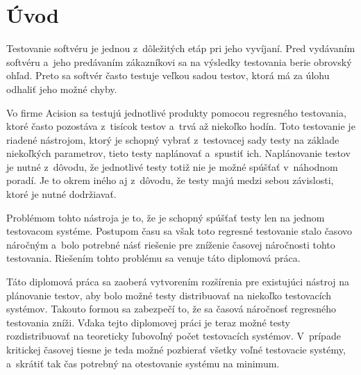 


%
%
\chapter{Úvod}
\label{kapitola:uvod}
Testovanie softvéru je jednou z~dôležitých etáp pri jeho vyvíjaní.
Pred vydávaním softvéru a~jeho predávaním zákazníkovi sa na výsledky
testovania berie obrovský ohľad. Preto sa softvér často testuje veľkou
sadou testov, ktorá má za úlohu odhaliť jeho možné chyby.

Vo firme Acision sa testujú jednotlivé produkty pomocou regresného 
testovania, ktoré často pozostáva z~tisícok testov a~trvá až niekoľko hodín.
Toto testovanie je riadené nástrojom, ktorý je schopný vybrať 
z~testovacej sady testy na základe niekoľkých parametrov, tieto testy 
naplánovať a~spustiť ich. 
Naplánovanie testov je nutné z~dôvodu, že jednotlivé testy totiž nie je 
možné spúšťať v~náhodnom poradí. Je to okrem iného aj z~dôvodu, 
že testy majú medzi sebou závislosti, ktoré je nutné dodržiavať. 

Problémom tohto nástroja je to, že je schopný spúšťať testy len na
jednom testovacom systéme. Postupom času sa však toto regresné testovanie
stalo časovo náročným a~bolo potrebné násť riešenie pre zníženie časovej
náročnosti tohto testovania. 
Riešením tohto problému sa venuje táto diplomová práca.

Táto diplomová práca sa zaoberá vytvorením rozšírenia pre existujúci
nástroj na plánovanie testov, aby bolo možné testy distribuovať na 
niekoľko testovacích systémov. Takouto formou sa zabezpečí to, že 
sa časová náročnosť regresného testovania zníži. 
Vďaka tejto diplomovej práci je teraz možné testy rozdistribuovať na 
teoreticky ľubovoľný počet testovacích systémov.
V~prípade kritickej časovej tiesne je teda možné pozbierať všetky voľné
testovacie systémy, a~skrátiť tak čas potrebný na otestovanie systému
na minimum.

